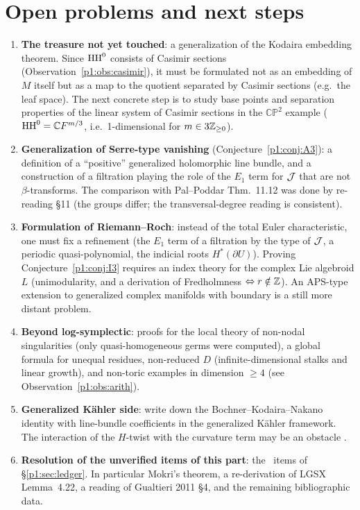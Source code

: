 \section{Open problems and next steps}\label{p1:sec:open}
\begin{enumerate}
\item \textbf{The treasure not yet touched}: a generalization of the Kodaira embedding theorem. Since $\mathrm{HH}^0$ consists of Casimir sections (Observation~\ref{p1:obs:casimir}), it must be formulated not as an embedding of $M$ itself but as a map to the quotient separated by Casimir sections (e.g.\ the leaf space). The next concrete step is to study base points and separation properties of the linear system of Casimir sections in the $\mathbb{CP}^2$ example ($\mathrm{HH}^0=\mathbb C F^{m/3}$, i.e.\ 1-dimensional for $m\in3\mathbb Z_{\ge0}$).
\item \textbf{Generalization of Serre-type vanishing} (Conjecture~\ref{p1:conj:A3}): a definition of a ``positive'' generalized holomorphic line bundle, and a construction of a filtration playing the role of the $E_1$ term for $\mathcal J$ that are not $\beta$-transforms. The comparison with Pal--Poddar Thm.~11.12 was done by re-reading \S11 (the groups differ; the transversal-degree reading is consistent).
\item \textbf{Formulation of Riemann--Roch}: instead of the total Euler characteristic, one must fix a refinement (the $E_1$ term of a filtration by the type of $\mathcal J$, a periodic quasi-polynomial, the indicial roots $H^*(\partial U)$). Proving Conjecture~\ref{p1:conj:I3} requires an index theory for the complex Lie algebroid $L$ (unimodularity, and a derivation of Fredholmness $\Leftrightarrow r\notin\mathbb Z$). An APS-type extension to generalized complex manifolds with boundary is a still more distant problem.
\item \textbf{Beyond log-symplectic}: proofs for the local theory of non-nodal singularities (only quasi-homogeneous germs were computed), a global formula for unequal residues, non-reduced $D$ (infinite-dimensional stalks and linear growth), and non-toric examples in dimension $\ge4$ (see Observation~\ref{p1:obs:arith}).
\item \textbf{Generalized K\"ahler side}: write down the Bochner--Kodaira--Nakano identity with line-bundle coefficients in the generalized K\"ahler framework. The interaction of the $H$-twist with the curvature term may be an obstacle \tK.
\item \textbf{Resolution of the unverified items of this part}: the \tQ\ items of \S\ref{p1:sec:ledger}. In particular Mokri's theorem, a re-derivation of LGSX Lemma~4.22, a reading of Gualtieri 2011 \S4, and the remaining bibliographic data.
\end{enumerate}

